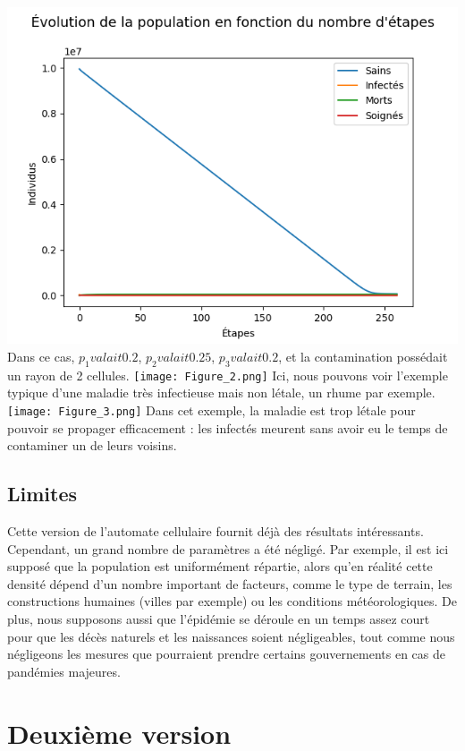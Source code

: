 \documentclass{article}
\begin{document}
	\begin{center}
	\includegraphics[scale=1.04]{Figure_1.png}
	Dans ce cas, $p_1 valait 0.2$, $p_2 valait 0.25$, $p_3 valait 0.2$, et la contamination possédait un rayon de 2 cellules.
	\texttt{[image: Figure\_2.png]}
	Ici, nous pouvons voir l'exemple typique d'une maladie très infectieuse mais non létale, un rhume par exemple.
	\texttt{[image: Figure\_3.png]} 
Dans cet exemple, la maladie est trop létale pour pouvoir se propager efficacement : les infectés meurent sans avoir eu le temps de contaminer un de leurs voisins.

	\end{center}
\subsection{Limites}
	Cette version de l'automate cellulaire fournit déjà des résultats intéressants. Cependant, un grand nombre de paramètres a été négligé. Par exemple, il est ici supposé que la population est uniformément répartie, alors qu'en réalité cette densité dépend d'un nombre important de facteurs, comme le type de terrain, les constructions humaines (villes par exemple) ou les conditions météorologiques. De plus, nous supposons aussi que l'épidémie se déroule en un temps assez court pour que les décès naturels et les naissances soient négligeables, tout comme nous négligeons les mesures que pourraient prendre certains gouvernements en cas de pandémies majeures.
	
	
	
\section{Deuxième version}
\end{document}
